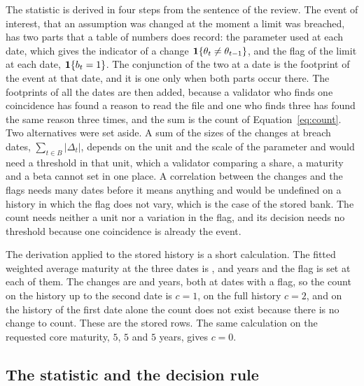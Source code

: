The statistic is derived in four steps from the sentence of the review. The event of interest, that an assumption was changed at the moment a limit was breached, has two parts that a table of numbers does record: the parameter used at each date, which gives the indicator of a change $\mathbf{1}\{\theta_t\ne\theta_{t-1}\}$, and the flag of the limit at each date, $\mathbf{1}\{b_t=1\}$. The conjunction of the two at a date is the footprint of the event at that date, and it is one only when both parts occur there. The footprints of all the dates are then added, because a validator who finds one coincidence has found a reason to read the file and one who finds three has found the same reason three times, and the sum is the count of Equation~\eqref{eq:count}. Two alternatives were set aside. A sum of the sizes of the changes at breach dates, $\sum_{t\in B}|\Delta_t|$, depends on the unit and the scale of the parameter and would need a threshold in that unit, which a validator comparing a share, a maturity and a beta cannot set in one place. A correlation between the changes and the flags needs many dates before it means anything and would be undefined on a history in which the flag does not vary, which is the case of the stored bank. The count needs neither a unit nor a variation in the flag, and its decision needs no threshold because one coincidence is already the event.

The derivation applied to the stored history is a short calculation. The fitted weighted average maturity at the three dates is \cOneFourWamA{}, \cOneFourWamB{} and \cOneFourWamC{} years and the flag is set at each of them. The changes are \cOneFourDeltaA{} and \cOneFourDeltaB{} years, both at dates with a flag, so the count on the history up to the second date is $c=1$, on the full history $c=2$, and on the history of the first date alone the count does not exist because there is no change to count. These are the stored rows. The same calculation on the requested core maturity, $5$, $5$ and $5$ years, gives $c=0$.

\subsection{The statistic and the decision rule}
\label{sec:method-statistic}


